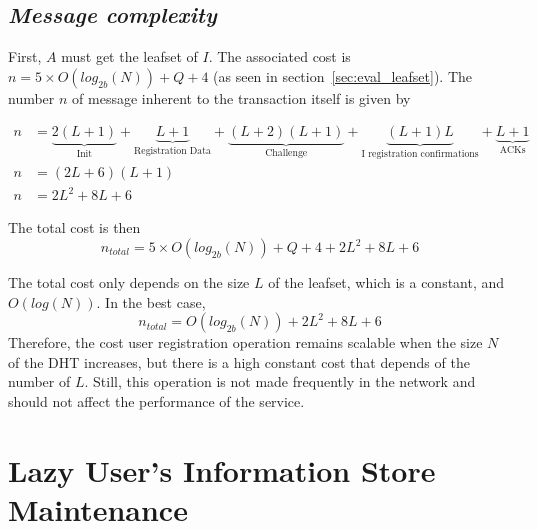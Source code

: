     
  \subsection{\textit{Message complexity}}
    First, $A$ must get the leafset of $I$. The associated cost is $n = 5
\times O(log_{2b}(N)) + Q + 4$ (as seen in section~\ref{sec:eval_leafset}).
    The number $n$ of message inherent to the transaction itself is given by

    \begin{align}
      n &= \underbrace{2(L+1)}_\text{Init} +
           \underbrace{L+1}_\text{Registration Data} +
           \underbrace{(L+2)(L+1)}_\text{Challenge} +
           \underbrace{(L+1)L}_\text{I registration confirmations} +
           \underbrace{L+1}_\text{ACKs}\\
      n &= (2L+6)(L+1)\\
      n &= 2L^2+ 8L + 6
    \end{align}

     The total cost is then
    $$
      n_{total} = 5 \times O(log_{2b}(N)) + Q + 4 + 2L^2 + 8L + 6
    $$    

    The total cost only depends on the size $L$ of the leafset, which is a
constant, and $O(log(N))$. In the best case, 
    $$
      n_{total} = O(log_{2b}(N)) + 2L^2 + 8L + 6
    $$
    Therefore, the cost user registration operation remains scalable when the
    size $N$ of the DHT increases, but there is a high constant cost that
    depends of the number of $L$. Still, this operation is not made frequently
    in the network and should not affect the performance of the
    service.

\section{Lazy User's Information Store Maintenance}
\label{sec:eval_lazy_maintenance}


